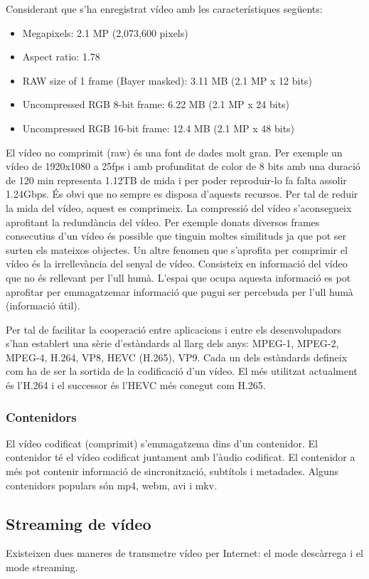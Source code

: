 \documentclass[12pt, titlepage]{article}
\begin{document}
Considerant que s'ha enregistrat vídeo amb les característiques següents:
\begin{itemize}
\item Megapixels: 2.1 MP (2,073,600 pixels)
\item Aspect ratio: 1.78
\item RAW size of 1 frame (Bayer masked): 3.11 MB (2.1 MP x 12 bits)
\item Uncompressed RGB 8-bit frame: 6.22 MB (2.1 MP x 24 bits)
\item Uncompressed RGB 16-bit frame: 12.4 MB (2.1 MP x 48 bits)
\end{itemize}

El vídeo no comprimit (raw) és una font de dades molt gran. Per exemple un vídeo
de 1920x1080 a 25fps i amb profunditat de color de 8 bits amb una duració de 120
min representa 1.12TB de mida i per poder reproduir-lo fa falta assolir 1.24Gbps.
És obvi que no sempre es disposa d’aquests recursos. Per tal de reduir la mida
del vídeo, aquest es comprimeix. La compressió del vídeo s’aconsegueix aprofitant
la redundància del vídeo. Per exemple donats diversos frames consecutius d’un
vídeo és possible que tinguin moltes similituds ja que pot ser surten els mateixos
objectes. Un altre fenomen que s’aprofita per comprimir el vídeo és la irrellevància
del senyal de vídeo. Consisteix en informació del vídeo que no és rellevant
per l’ull humà. L’espai que ocupa aquesta informació es pot aprofitar per
emmagatzemar informació que pugui ser percebuda per l’ull humà (informació útil).

Per tal de facilitar la cooperació entre aplicacions i entre els desenvolupadors
s’han establert una sèrie d’estàndards al llarg dels anys: MPEG-1, MPEG-2, MPEG-4,
H.264, VP8, HEVC (H.265), VP9. Cada un dels estàndards defineix com ha de ser
la sortida de la codificació d’un vídeo. El més utilitzat actualment és l’H.264 i
el successor és l’HEVC més conegut com H.265.

\subsubsection{Contenidors}
El vídeo codificat (comprimit) s’emmagatzema dins d’un contenidor. El contenidor
té el vídeo codificat juntament amb l’àudio codificat. El contenidor a més pot
contenir informació de sincronització, subtítols i metadades. Alguns contenidors
populars són mp4, webm, avi i mkv.

\subsection{Streaming de vídeo}
Existeixen dues maneres de transmetre vídeo per Internet: el mode descàrrega i
el mode streaming.
\end{document}
